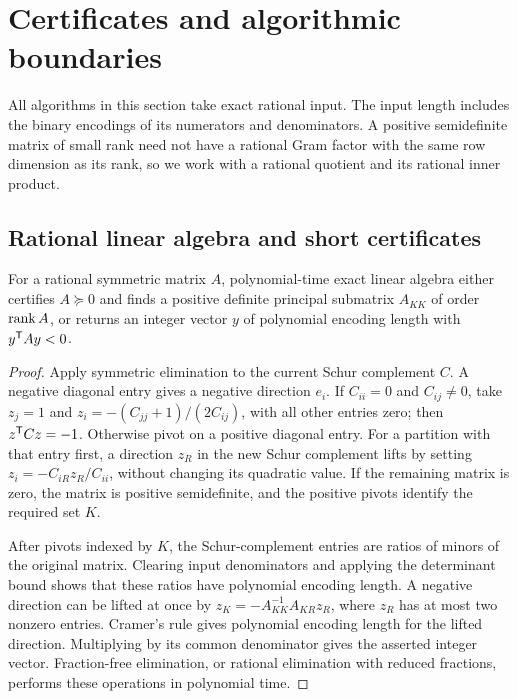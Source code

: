 \section{Certificates and algorithmic boundaries}
\label{sec:algorithms}

All algorithms in this section take exact rational input. The input length
includes the binary encodings of its numerators and denominators. A
positive semidefinite matrix of small rank need not have a rational Gram
factor with the same row dimension as its rank, so we work with a
rational quotient and its rational inner product.

\subsection{Rational linear algebra and short certificates}

\begin{lemma}\label{lem:rational-negative-direction}
For a rational symmetric matrix $A$, polynomial-time exact linear algebra
either certifies $A\succeq0$ and finds a positive definite principal
submatrix $A_{KK}$ of order $\operatorname{rank} A$, or returns an integer vector $y$ of
polynomial encoding length with $y^{\mathsf T} Ay<0$.
\end{lemma}

\begin{proof}
Apply symmetric elimination to the current Schur complement $C$. A
negative diagonal entry gives a negative direction $e_i$. If $C_{ii}=0$
and $C_{ij}\ne0$, take $z_j=1$ and
$z_i=-(C_{jj}+1)/(2C_{ij})$, with all other entries zero; then
$z^{\mathsf T} Cz=-1$. Otherwise pivot on a positive diagonal entry. For a
partition with that entry first, a direction $z_R$ in the new Schur
complement lifts by setting $z_i=-C_{iR}z_R/C_{ii}$, without changing its
quadratic value. If the remaining matrix is zero, the matrix is positive
semidefinite, and the positive pivots identify the required set $K$.

After pivots indexed by $K$, the Schur-complement entries are ratios of
minors of the original matrix. Clearing input denominators and applying
the determinant bound shows that these ratios have polynomial encoding
length. A negative direction can be lifted at once by
$z_K=-A_{KK}^{-1}A_{KR}z_R$, where $z_R$ has at most two nonzero entries.
Cramer's rule gives polynomial encoding length for the lifted direction.
Multiplying by its common denominator gives the asserted integer vector.
Fraction-free elimination, or rational elimination with reduced
fractions, performs these operations in polynomial time.
\end{proof}

